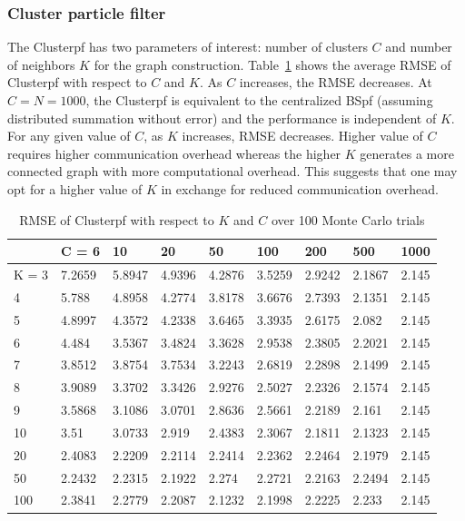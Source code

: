 \documentclass[10pt,letterpaper,final]{article}
\begin{document}
\subsubsection{Cluster particle filter}
The Clusterpf has two parameters of interest: number of clusters $C$ and number of neighbors $K$ for the graph construction. Table~\ref{tab:RMSE_clusterpf} shows the average RMSE of Clusterpf with respect to $C$ and $K$. As $C$ increases, the RMSE decreases. At $C=N=1000$, the Clusterpf is equivalent to the centralized BSpf (assuming distributed summation without error) and the performance is independent of $K$. For any given value of $C$, as $K$ increases, RMSE decreases. Higher value of $C$ requires higher communication overhead whereas the higher $K$ generates a more connected graph with more computational overhead. This suggests that one may opt for a higher value of $K$ in exchange for reduced communication overhead. 

\begin{table}[h!]
\centering
\begin{tabular}{|l|l|l|l|l|l|l|l|l|}
\hline
      & C = 6  & 10     & 20     & 50     & 100    & 200    & 500    & 1000  \\ \hline
K = 3 & 7.2659 & 5.8947 & 4.9396 & 4.2876 & 3.5259 & 2.9242 & 2.1867 & 2.145 \\ \hline
4     & 5.788  & 4.8958 & 4.2774 & 3.8178 & 3.6676 & 2.7393 & 2.1351 & 2.145 \\ \hline
5     & 4.8997 & 4.3572 & 4.2338 & 3.6465 & 3.3935 & 2.6175 & 2.082  & 2.145 \\ \hline
6     & 4.484  & 3.5367 & 3.4824 & 3.3628 & 2.9538 & 2.3805 & 2.2021 & 2.145 \\ \hline
7     & 3.8512 & 3.8754 & 3.7534 & 3.2243 & 2.6819 & 2.2898 & 2.1499 & 2.145 \\ \hline
8     & 3.9089 & 3.3702 & 3.3426 & 2.9276 & 2.5027 & 2.2326 & 2.1574 & 2.145 \\ \hline
9     & 3.5868 & 3.1086 & 3.0701 & 2.8636 & 2.5661 & 2.2189 & 2.161  & 2.145 \\ \hline
10    & 3.51   & 3.0733 & 2.919  & 2.4383 & 2.3067 & 2.1811 & 2.1323 & 2.145 \\ \hline
20    & 2.4083 & 2.2209 & 2.2114 & 2.2414 & 2.2362 & 2.2464 & 2.1979 & 2.145 \\ \hline
50    & 2.2432 & 2.2315 & 2.1922 & 2.274  & 2.2721 & 2.2163 & 2.2494 & 2.145 \\ \hline
100   & 2.3841 & 2.2779 & 2.2087 & 2.1232 & 2.1998 & 2.2225 & 2.233  & 2.145 \\ \hline
\end{tabular}
\caption{RMSE of Clusterpf with respect to $K$ and $C$ over 100 Monte Carlo trials}
\label{tab:RMSE_clusterpf}
\end{table}
\end{document}
